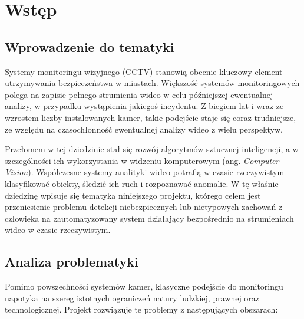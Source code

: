 \chapter{Wstęp}
\section{Wprowadzenie do tematyki}
Systemy monitoringu wizyjnego (CCTV) stanowią obecnie kluczowy element utrzymywania bezpieczeństwa w miastach. Większość systemów monitoringowych polega na zapisie pełnego strumienia wideo w celu późniejszej ewentualnej analizy, w przypadku wystąpienia jakiegoś incydentu. Z biegiem lat i wraz ze wzrostem liczby instalowanych kamer, takie podejście staje się coraz trudniejsze, ze względu na czasochłonność ewentualnej analizy wideo z wielu perspektyw.

Przełomem w tej dziedzinie stał się rozwój algorytmów sztucznej inteligencji, a w szczególności ich wykorzystania w widzeniu komputerowym (ang. \textit{Computer Vision}). Współczesne systemy analityki wideo potrafią w czasie rzeczywistym klasyfikować obiekty, śledzić ich ruch i rozpoznawać anomalie. W tę właśnie dziedzinę wpisuje się tematyka niniejszego projektu, którego celem jest przeniesienie problemu detekcji niebezpiecznych lub nietypowych zachowań z człowieka na zautomatyzowany system działający bezpośrednio na strumieniach wideo w czasie rzeczywistym.


\section{Analiza problematyki}
Pomimo powszechności systemów kamer, klasyczne podejście do monitoringu napotyka na szereg istotnych ograniczeń natury ludzkiej, prawnej oraz technologicznej. Projekt rozwiązuje te problemy z następujących obszarach:

